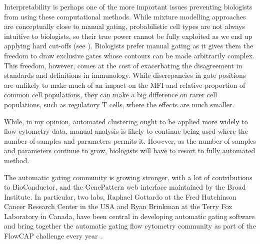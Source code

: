 Interpretability is perhaps one of the more important issues preventing biologists from using these computational methods.
While mixture modelling approaches are conceptually close to manual gating, probabilistic cell types are not always intuitive to biologists, so their true power cannot be fully exploited as we end up applying hard cut-offs (see ).
Biologists prefer manual gating as it gives them the freedom to draw exclusive gates whose contours can be made arbitrarily complex.
This freedom, however, comes at the cost of exacerbating the disagreement in standards and definitions in immunology.
While discrepancies in gate positions are unlikely to make much of an impact on the MFI and relative proportion of common cell populations, they can make a big difference on rarer cell populations, such as regulatory T cells, where the effects are much smaller.


While, in my opinion, automated clustering ought to be applied more widely to flow cytometry data, manual analysis is likely to continue being used where the number of samples and parameters permits it.
However, as the number of samples and parameters continue to grow, biologists will have to resort to fully automated method.

The automatic gating community is growing stronger, with a lot of contributions to BioConductor, and the GenePattern web interface maintained by the Broad Institute.
In particular, two labs, Raphael Gottardo at the Fred Hutchinson Cancer Research Center in the USA and Ryan Brinkman at the Terry Fox Laboratory in Canada, have been central in developing automatic gating software and bring together the automatic gating flow cytometry community as part of the FlowCAP challenge every year \citep{Aghaeepour:2013dg}.


